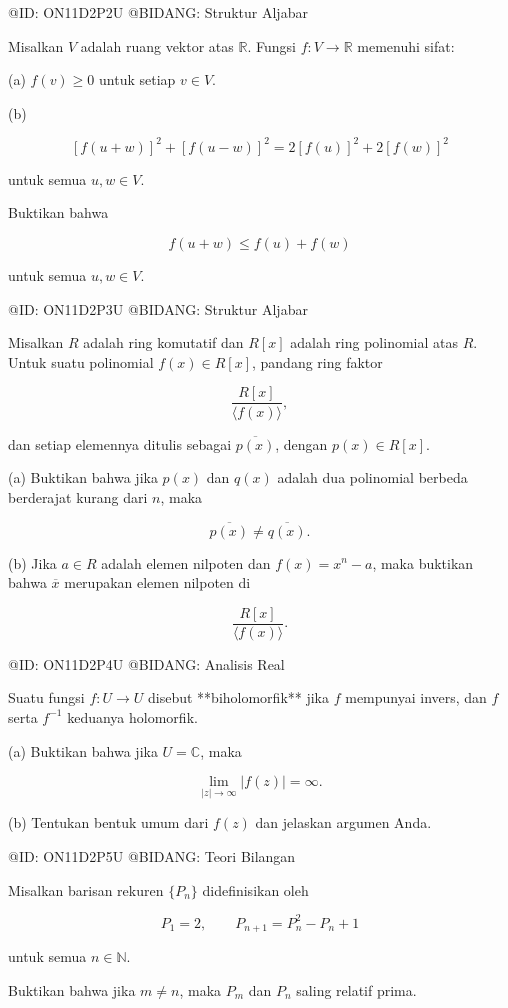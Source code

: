 @ID: ON11D2P2U
@BIDANG: Struktur Aljabar

Misalkan $V$ adalah ruang vektor atas $\mathbb R$. Fungsi $f:V\to\mathbb R$ memenuhi sifat:

(a) $f(v)\ge0$ untuk setiap $v\in V$.

(b)

$$
[f(u+w)]^2+[f(u-w)]^2
=
2[f(u)]^2+2[f(w)]^2
$$

untuk semua $u,w\in V$.

Buktikan bahwa

$$
f(u+w)\le f(u)+f(w)
$$

untuk semua $u,w\in V$.

@ID: ON11D2P3U
@BIDANG: Struktur Aljabar

Misalkan $R$ adalah ring komutatif dan $R[x]$ adalah ring polinomial atas $R$. Untuk suatu polinomial $f(x)\in R[x]$, pandang ring faktor

$$
\frac{R[x]}{\langle f(x)\rangle},
$$

dan setiap elemennya ditulis sebagai $\overline{p(x)}$, dengan $p(x)\in R[x]$.

(a) Buktikan bahwa jika $p(x)$ dan $q(x)$ adalah dua polinomial berbeda berderajat kurang dari $n$, maka

$$
\overline{p(x)}\ne\overline{q(x)}.
$$

(b) Jika $a\in R$ adalah elemen nilpoten dan $f(x)=x^n-a$, maka buktikan bahwa $\overline{x}$ merupakan elemen nilpoten di

$$
\frac{R[x]}{\langle f(x)\rangle}.
$$

@ID: ON11D2P4U
@BIDANG: Analisis Real

Suatu fungsi $f:U\to U$ disebut **biholomorfik** jika $f$ mempunyai invers, dan $f$ serta $f^{-1}$ keduanya holomorfik.

(a) Buktikan bahwa jika $U=\mathbb C$, maka

$$
\lim_{|z|\to\infty}|f(z)|=\infty.
$$

(b) Tentukan bentuk umum dari $f(z)$ dan jelaskan argumen Anda.

@ID: ON11D2P5U
@BIDANG: Teori Bilangan

Misalkan barisan rekuren $\{P_n\}$ didefinisikan oleh

$$
P_1=2,\qquad
P_{n+1}=P_n^2-P_n+1
$$

untuk semua $n\in\mathbb N$.

Buktikan bahwa jika $m\ne n$, maka $P_m$ dan $P_n$ saling relatif prima.